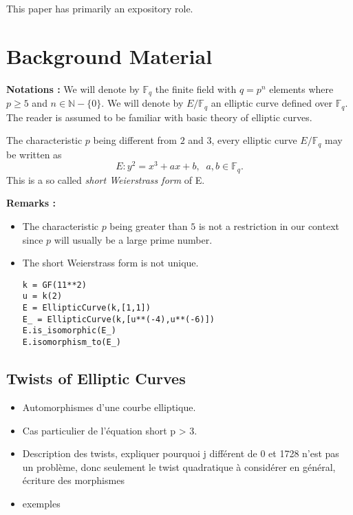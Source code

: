 \documentclass[10pt]{article}
\theoremstyle{definition}
\newcommand{\N}{\mathbb{N}}
\newcommand{\F}{\mathbb{F}}
\begin{document}
This paper has primarily an expository role.

\section{Background Material}

\textbf{Notations :}
We will denote by $\F_q$ the finite field with $q = p^n$ elements where $p \geq 5$ and $n \in \N - \lbrace 0 \rbrace$.
We will denote by $E/\F_q$ an elliptic curve defined over $\F_q$. 
The reader is assumed to be familiar with basic theory of elliptic curves.

\vspace*{.5cm}

\noindent The characteristic $p$ being different from $2$ and $3$, every elliptic curve $E/\F_q$ may be written as
\[ E : y^2 = x^3 + ax + b, \; \; a,b \in \F_q. \]
This is a so called \textsl{short Weierstrass form} of E.

\vspace*{.5cm}

\noindent \textbf{Remarks :} 
\begin{itemize}
\item The characteristic $p$ being greater than $5$ is not a restriction in our context since $p$ will usually be a large prime number.
\item The short Weierstrass form is not unique.

\begin{verbatim}
k = GF(11**2)
u = k(2)
E = EllipticCurve(k,[1,1])
E_ = EllipticCurve(k,[u**(-4),u**(-6)])
E.is_isomorphic(E_)
E.isomorphism_to(E_)
\end{verbatim}
\end{itemize}

\subsection{Twists of Elliptic Curves}

\begin{itemize}
\item Automorphismes d'une courbe elliptique. 
\item Cas particulier de l'équation short p > 3.
\item Description des twists, expliquer pourquoi j différent de 0 et 1728 n'est pas un problème, donc seulement le twist quadratique à considérer en général, écriture des morphismes
\item exemples
\end{itemize}
\end{document}
